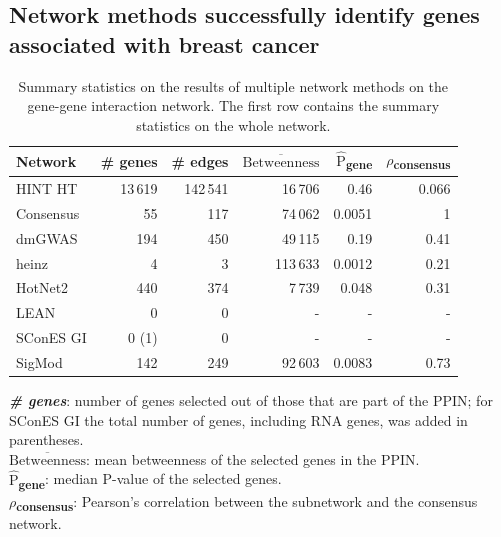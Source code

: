 \documentclass[twocolumn, 10pt]{article}
\newcommand{\mean}[1]{$\overline{\mbox{#1}}$}
\newcommand{\median}[1]{$\hat{\mbox{#1}}$}
\begin{document}
\subsection{Network methods successfully identify genes associated with breast cancer}
\label{results:separate_networks}
\begin{table}[htbp]
  \centering
  \begin{threeparttable}
\caption{\label{tab:gene_solutions}
Summary statistics on the results of multiple network methods on the gene-gene interaction network. The first row contains the summary statistics on the whole network.}
\centering
\begin{tabular}{lrrrrr}
Network & \# genes & \# edges & \mean{Betweenness} & \median{P}\textsubscript{gene} & \(\rho\)\textsubscript{consensus}\\
\hline
HINT HT & 13\,619 & 142\,541 & 16\,706 & 0.46 & 0.066\\
\hline
Consensus & 55 & 117 & 74\,062 & 0.0051 & 1\\
dmGWAS & 194 & 450 & 49\,115 & 0.19 & 0.41\\
heinz & 4 & 3 & 113\,633 & 0.0012 & 0.21\\
HotNet2 & 440 & 374 & 7\,739 & 0.048 & 0.31\\
LEAN & 0 & 0 & - & - & -\\
SConES GI & 0 (1) & 0 & - & - & -\\
SigMod & 142 & 249 & 92\,603 & 0.0083 & 0.73\\
\end{tabular}
\begin{tablenotes}
  \textbf{\emph{\# genes}}: number of genes selected out of those that are part of the PPIN; for SConES GI the total number of genes, including RNA genes, was added in parentheses.\\
  \textbf{\mean{Betweenness}}: mean betweenness of the selected genes in the PPIN.\\
  \textbf{\median{P}\textsubscript{gene}}: median P-value of the selected genes.\\
  \textbf{\(\rho\)\textsubscript{consensus}}: Pearson's correlation between the subnetwork and the consensus network.
\end{tablenotes}
\end{threeparttable}
\end{table}
\end{document}
